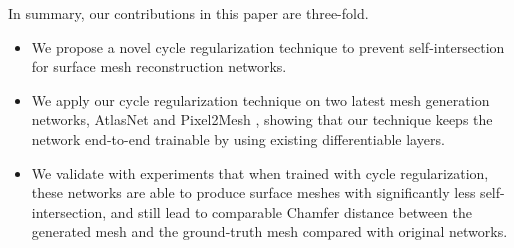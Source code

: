 In summary, our contributions in this paper are three-fold.
\begin{itemize}
	\item We propose a novel cycle regularization technique to prevent self-intersection for surface mesh reconstruction networks. 
	\item We apply our cycle regularization technique on two latest mesh generation networks, AtlasNet \cite{atlasnet} and Pixel2Mesh \cite{pixel2mesh}, showing that our technique keeps the network end-to-end trainable by using existing differentiable layers.
	\item We validate with experiments that when trained with cycle regularization, these networks are able to produce surface meshes with significantly less self-intersection, and still lead to comparable  Chamfer distance between the generated mesh and the ground-truth mesh compared with original networks. 
\end{itemize}

 